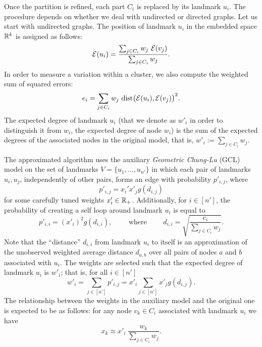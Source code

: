 Once the partition is refined, each part $C_i$ is replaced by its landmark $u_i$. The procedure depends on whether we deal with undirected or directed graphs. Let us start with undirected graphs. The position of landmark $u_i$ in the embedded space ${\mathbb R}^k$ is assigned as follows:
\begin{equation}\label{eq:position_landmark}
\mathcal E(u_i) = \frac {\sum_{j \in C_i} w_j \ \mathcal E(v_j)}{\sum_{j \in C_i} w_j}.
\end{equation}
In order to measure a variation within a cluster, we also compute the weighted sum of squared errors:
\begin{equation}\label{eq:error_landmark}
e_i = \sum_{j \in C_i} w_j \ \mathrm{dist} \big( \mathcal E(u_i), \mathcal E(v_j) \big)^2.
\end{equation}
The expected degree of landmark $u_i$ (that we denote as $w'_i$ in order to distinguish it from $w_i$, the expected degree of node $w_i$) is the sum of the expected degrees of the associated nodes in the original model, that is, $w'_i := \sum_{j \in C_i} w_j$.

The approximated algorithm uses the auxiliary \emph{Geometric Chung-Lu} (GCL) model on the set of landmarks $V = \{ u_1, \ldots, u_{n'} \}$ in which each pair of landmarks $u_i, u_j$, independently of other pairs, forms an edge with probability $p'_{i,j}$, where
\begin{equation*}
p'_{i,j} = x_i' x'_j g(d_{i,j}) 
\end{equation*}
for some carefully tuned weights $x'_i \in {\mathbb R}_+$. Additionally, for $i\in[n']$, the probability of creating a self loop around landmark $u_i$ is equal to 
$$
p'_{i,i} = (x'_i)^2 g(d_{i,i}), \qquad \text{ where } \qquad d_{i,i} = \sqrt{ \frac{e_i}{\sum_{j \in C_i} w_j} }.
$$
Note that the ``distance'' $d_{i,i}$ from landmark $u_i$ to itself is an approximation of the unobserved weighted average distance $d_{a,b}$ over all pairs of nodes $a$ and $b$ associated with $u_i$.
The weights are selected such that the expected degree of landmark $u_i$ is $w'_i$; that is, for all $i \in [n']$
$$
w'_i = \sum_{j \in [n']} p'_{i,j} =  x'_i \sum_{j \in [n']} x'_j g(d_{i,j}).
$$
The relationship between the weights in the auxiliary model and the original one is expected to be as follows: for any node $v_k \in C_i$ associated with landmark $u_i$ we have
$$
x_k \approx x'_i \ \frac {w_k}{\sum_{j \in C_i} w_j}.
$$

